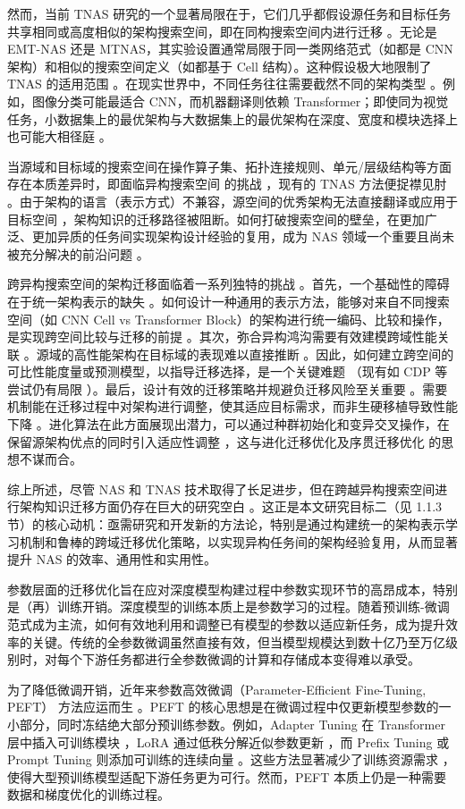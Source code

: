 \documentclass[../main.tex]{subfiles}
\begin{document}
然而，当前 TNAS 研究的一个显著局限在于，它们几乎都假设源任务和目标任务共享相同或高度相似的架构搜索空间，即在同构搜索空间内进行迁移 。无论是 EMT-NAS 还是 MTNAS，其实验设置通常局限于同一类网络范式（如都是 CNN 架构）和相似的搜索空间定义（如都基于 Cell 结构）。这种假设极大地限制了 TNAS 的适用范围 。在现实世界中，不同任务往往需要截然不同的架构类型 。例如，图像分类可能最适合 CNN，而机器翻译则依赖 Transformer；即使同为视觉任务，小数据集上的最优架构与大数据集上的最优架构在深度、宽度和模块选择上也可能大相径庭 。

当源域和目标域的搜索空间在操作算子集、拓扑连接规则、单元/层级结构等方面存在本质差异时，即面临异构搜索空间 的挑战 ，现有的 TNAS 方法便捉襟见肘 。由于架构的语言（表示方式）不兼容，源空间的优秀架构无法直接翻译或应用于目标空间 ，架构知识的迁移路径被阻断。如何打破搜索空间的壁垒，在更加广泛、更加异质的任务间实现架构设计经验的复用，成为 NAS 领域一个重要且尚未被充分解决的前沿问题 。

跨异构搜索空间的架构迁移面临着一系列独特的挑战 。首先，一个基础性的障碍在于统一架构表示的缺失 。如何设计一种通用的表示方法，能够对来自不同搜索空间（如 CNN Cell vs Transformer Block）的架构进行统一编码、比较和操作，是实现跨空间比较与迁移的前提 。其次，弥合异构鸿沟需要有效建模跨域性能关联 。源域的高性能架构在目标域的表现难以直接推断 。因此，如何建立跨空间的可比性能度量或预测模型，以指导迁移选择，是一个关键难题 （现有如 CDP 等尝试仍有局限 ）。最后，设计有效的迁移策略并规避负迁移风险至关重要 。需要机制能在迁移过程中对架构进行调整，使其适应目标需求，而非生硬移植导致性能下降 。进化算法在此方面展现出潜力，可以通过种群初始化和变异交叉操作，在保留源架构优点的同时引入适应性调整 ，这与进化迁移优化及序贯迁移优化 的思想不谋而合。

综上所述，尽管 NAS 和 TNAS 技术取得了长足进步，但在跨越异构搜索空间进行架构知识迁移方面仍存在巨大的研究空白 。这正是本文研究目标二（见 1.1.3 节）的核心动机：亟需研究和开发新的方法论，特别是通过构建统一的架构表示学习机制和鲁棒的跨域迁移优化策略，以实现异构任务间的架构经验复用，从而显著提升 NAS 的效率、通用性和实用性。


参数层面的迁移优化旨在应对深度模型构建过程中参数实现环节的高昂成本，特别是（再）训练开销。深度模型的训练本质上是参数学习的过程。随着预训练-微调范式成为主流，如何有效地利用和调整已有模型的参数以适应新任务，成为提升效率的关键。传统的全参数微调虽然直接有效，但当模型规模达到数十亿乃至万亿级别时，对每个下游任务都进行全参数微调的计算和存储成本变得难以承受。

为了降低微调开销，近年来参数高效微调（Parameter-Efficient Fine-Tuning, PEFT） 方法应运而生 。PEFT 的核心思想是在微调过程中仅更新模型参数的一小部分，同时冻结绝大部分预训练参数。例如，Adapter Tuning 在 Transformer 层中插入可训练模块 ，LoRA 通过低秩分解近似参数更新 ，而 Prefix Tuning 或 Prompt Tuning 则添加可训练的连续向量 。这些方法显著减少了训练资源需求 ，使得大型预训练模型适配下游任务更为可行。然而，PEFT 本质上仍是一种需要数据和梯度优化的训练过程。
\end{document}
